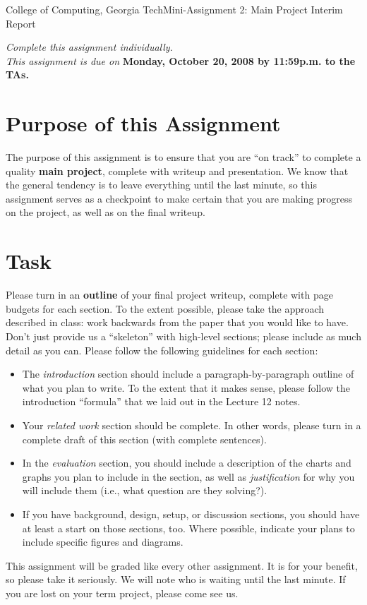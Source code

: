 \documentclass[11pt]{article}
\begin{document}


{College of Computing, Georgia Tech}{Mini-Assignment 2: Main Project
  Interim Report} 

{\em Complete this assignment individually. \\  This
  assignment is due on} {\bf Monday, October 20, 2008 by 11:59p.m. to
  the TAs.}

\section{Purpose of this Assignment}

The purpose of this assignment is to ensure that you are ``on track'' to
complete a quality {\bf main project}, complete with writeup and
presentation.  We know that the general tendency is to leave everything
until the last minute, so this assignment serves as a checkpoint to make
certain that you are making progress on the project, as well as on the
final writeup.

\section{Task}

Please turn in an {\bf outline} of your final project writeup, complete
with page budgets for each section.  To the extent possible, please take
the approach described in class: work backwards from the paper that you
would like to have.  Don't just provide us a ``skeleton'' with
high-level sections; please include as much detail as you can.  Please
follow the following guidelines for each section:
\begin{itemize}
\itemsep=-1pt
\item The {\em introduction} section should include a
  paragraph-by-paragraph outline of what you plan to write.  To the
  extent that it makes sense, please follow the introduction ``formula''
  that we laid out in the Lecture 12 notes.
\item Your {\em related work} section should be complete.  In other
  words, please turn in a complete draft of this section (with complete
  sentences). 
\item In the {\em evaluation} section, you should include a description
  of the charts and graphs you plan to include in the section, as well
  as {\em justification} for why you will include them (i.e., what
  question are they solving?).
\item If you have background, design, setup, or discussion sections, you
  should have at least a start on those sections, too.  Where possible,
  indicate your plans to include specific figures and diagrams.
\end{itemize}
\noindent
This assignment will be graded like every other assignment.  It is for
your benefit, so please take it seriously.  We will note who is waiting
until the last minute.  If you are lost on your term project, please
come see us.
\end{document}
